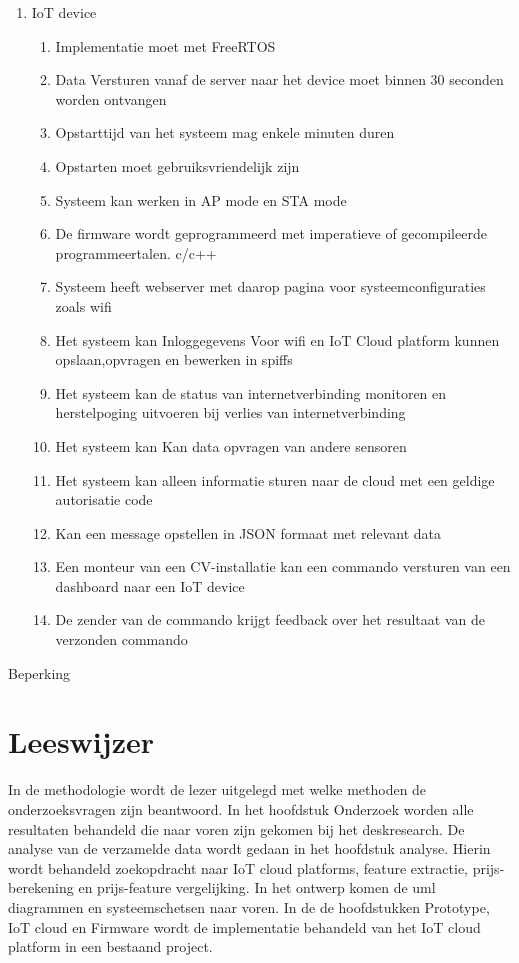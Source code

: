 \begin{enumerate}
	\item IoT device
	\begin{enumerate}
		\item Implementatie moet met FreeRTOS 
		\item Data Versturen vanaf de server naar het device moet binnen 30 seconden worden ontvangen
		\item Opstarttijd van het systeem mag enkele minuten duren 
		\item Opstarten moet gebruiksvriendelijk zijn 
		\item Systeem kan werken in AP mode en STA mode
		\item De firmware wordt geprogrammeerd met imperatieve of gecompileerde programmeertalen. c/c++
		\item Systeem heeft webserver met daarop pagina voor systeemconfiguraties zoals wifi
		\item Het systeem kan Inloggegevens Voor wifi en IoT Cloud platform kunnen opslaan,opvragen en bewerken in spiffs
		\item Het systeem kan de status van internetverbinding monitoren en herstelpoging uitvoeren bij verlies van internetverbinding
		\item Het systeem kan Kan data opvragen van andere sensoren
		\item Het systeem kan alleen informatie sturen naar de cloud met een geldige autorisatie code
		\item Kan een message opstellen in JSON formaat met relevant data
		\item Een monteur van een CV-installatie kan een commando versturen van een dashboard naar een IoT device
		\item De zender van de commando krijgt feedback over het resultaat van de verzonden commando
	\end{enumerate}
	
\end{enumerate}



Beperking


 


\section{Leeswijzer}
In  de methodologie wordt de lezer uitgelegd met welke methoden de onderzoeksvragen zijn beantwoord. In het hoofdstuk Onderzoek worden alle resultaten behandeld die naar voren zijn gekomen bij het deskresearch. De analyse van de verzamelde data wordt gedaan in het hoofdstuk analyse. Hierin wordt behandeld zoekopdracht naar IoT cloud platforms, feature extractie, prijs-berekening en prijs-feature vergelijking. In het ontwerp komen de uml diagrammen en systeemschetsen naar voren. In de  de hoofdstukken Prototype, IoT cloud en Firmware wordt de implementatie behandeld van het IoT cloud platform in een bestaand project.





